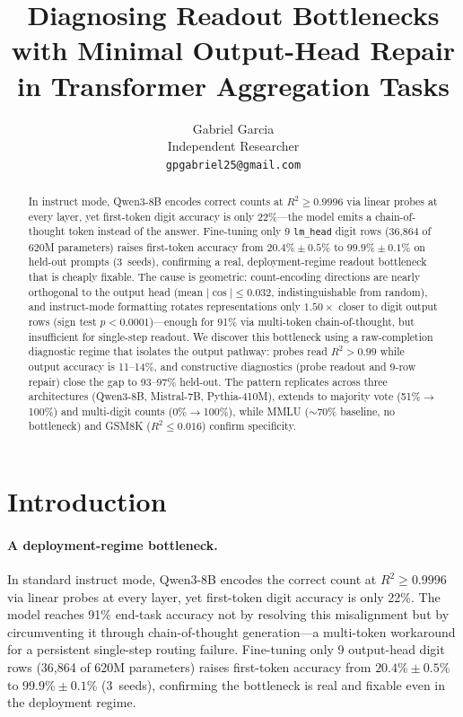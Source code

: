 \documentclass{article}
\title{Diagnosing Readout Bottlenecks with Minimal Output-Head Repair in Transformer Aggregation Tasks}
\author{
  Gabriel Garcia \\
  Independent Researcher \\
  \texttt{gpgabriel25@gmail.com}
}
\begin{document}
\maketitle

\begin{abstract}
In instruct mode, Qwen3-8B encodes correct counts at $R^2 \geq 0.9996$ via linear probes at every layer, yet first-token digit accuracy is only 22\%---the model emits a chain-of-thought token instead of the answer. Fine-tuning only 9 \texttt{lm\_head} digit rows (36,864 of 620M parameters) raises first-token accuracy from $20.4\% \pm 0.5\%$ to $\mathbf{99.9\% \pm 0.1\%}$ on held-out prompts (3~seeds), confirming a real, deployment-regime readout bottleneck that is cheaply fixable. The cause is geometric: count-encoding directions are nearly orthogonal to the output head (mean $|\cos| \leq 0.032$, indistinguishable from random), and instruct-mode formatting rotates representations only $1.50\times$ closer to digit output rows (sign test $p < 0.0001$)---enough for 91\% via multi-token chain-of-thought, but insufficient for single-step readout. We discover this bottleneck using a raw-completion diagnostic regime that isolates the output pathway: probes read $R^2 > 0.99$ while output accuracy is 11--14\%, and constructive diagnostics (probe readout and 9-row repair) close the gap to 93--97\% held-out. The pattern replicates across three architectures (Qwen3-8B, Mistral-7B, Pythia-410M), extends to majority vote (51\%$\to$100\%) and multi-digit counts (0\%$\to$100\%), while MMLU ($\sim$70\% baseline, no bottleneck) and GSM8K ($R^2 \leq 0.016$) confirm specificity.
\end{abstract}

\section{Introduction}

\paragraph{A deployment-regime bottleneck.}
In standard instruct mode, Qwen3-8B encodes the correct count at $R^2 \geq 0.9996$ via linear probes at every layer, yet first-token digit accuracy is only 22\%.
The model reaches 91\% end-task accuracy not by resolving this misalignment but by circumventing it through chain-of-thought generation---a multi-token workaround for a persistent single-step routing failure.
Fine-tuning only 9 output-head digit rows (36,864 of 620M parameters) raises first-token accuracy from $20.4\% \pm 0.5\%$ to $99.9\% \pm 0.1\%$ (3~seeds), confirming the bottleneck is real and fixable even in the deployment regime.
\end{document}
